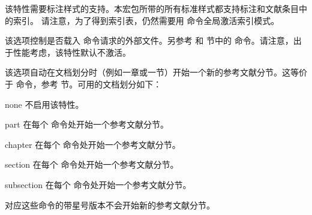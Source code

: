 \begin{optionlist}
该特性需要标注样式的支持。本宏包所带的所有标准样式都支持标注和文献条目中的索引。
请注意，为了得到索引表，仍然需要用  命令全局激活索引模式。


该选项控制是否载入  命令请求的外部文件。另参考  和  节中的  命令。请注意，出于性能考虑，该特性默认不激活。


该选项自动在文档划分时（例如一章或一节）开始一个新的参考文献分节。这等价于  命令，参考  节。可用的文档划分如下：

\begin{valuelist}
\item[none] %
不启用该特性。
\item[part] %
在每个  命令处开始一个参考文献分节。
\item[chapter] %
在每个  命令处开始一个参考文献分节。
\item[section] %
在每个  命令处开始一个参考文献分节。
\item[subsection] %
在每个  命令处开始一个参考文献分节。
\end{valuelist}
%
对应这些命令的带星号版本不会开始新的参考文献分节。


\end{optionlist}
